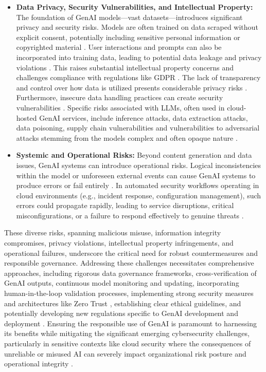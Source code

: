 \begin{itemize}
    \item \textbf{Data Privacy, Security Vulnerabilities, and Intellectual Property:} The foundation of GenAI models—vast datasets—introduces significant privacy and security risks. Models are often trained on data scraped without explicit consent, potentially including sensitive personal information or copyrighted material \cite{nyoto_cyber_2024}. User interactions and prompts can also be incorporated into training data, leading to potential data leakage and privacy violations \cite{nyoto_cyber_2024}. This raises substantial intellectual property concerns and challenges compliance with regulations like GDPR \cite{nyoto_cyber_2024}. The lack of transparency and control over how data is utilized presents considerable privacy risks \cite{nyoto_cyber_2024}. Furthermore, insecure data handling practices can create security vulnerabilities \cite{surathunmanun_exploring_2024}. Specific risks associated with LLMs, often used in cloud-hosted GenAI services, include inference attacks, data extraction attacks, data poisoning, supply chain vulnerabilities \cite{surathunmanun_exploring_2024} and vulnerabilities to adversarial attacks stemming from the models complex and often opaque nature \cite{dash_zero-trust_2024}.

    \item \textbf{Systemic and Operational Risks:} Beyond content generation and data issues, GenAI systems can introduce operational risks. Logical inconsistencies within the model or unforeseen external events can cause GenAI systems to produce errors or fail entirely \cite{surathunmanun_exploring_2024}. In automated security workflows operating in cloud environments (e.g., incident response, configuration management), such errors could propagate rapidly, leading to service disruptions, critical misconfigurations, or a failure to respond effectively to genuine threats \cite{surathunmanun_exploring_2024}.
\end{itemize}

These diverse risks, spanning malicious misuse, information integrity compromises, privacy violations, intellectual property infringements, and operational failures, underscore the critical need for robust countermeasures and responsible governance. Addressing these challenges necessitates comprehensive approaches, including rigorous data governance frameworks, cross-verification of GenAI outputs, continuous model monitoring and updating, incorporating human-in-the-loop validation processes, implementing strong security measures \cite{surathunmanun_exploring_2024} and architectures like Zero Trust \cite{surathunmanun_exploring_2024, dash_zero-trust_2024}, establishing clear ethical guidelines, and potentially developing new regulations specific to GenAI development and deployment \cite{nyoto_cyber_2024}. Ensuring the responsible use of GenAI is paramount to harnessing its benefits while mitigating the significant emerging cybersecurity challenges, particularly in sensitive contexts like cloud security where the consequences of unreliable or misused AI can severely impact organizational risk posture and operational integrity \cite{surathunmanun_exploring_2024}.

